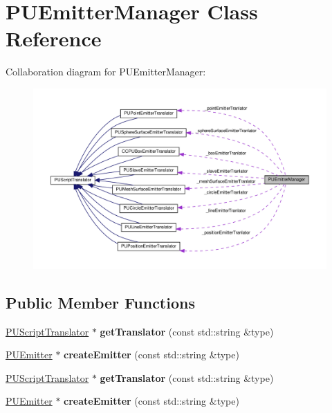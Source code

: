 \hypertarget{classPUEmitterManager}{}\section{P\+U\+Emitter\+Manager Class Reference}
\label{classPUEmitterManager}


Collaboration diagram for P\+U\+Emitter\+Manager\+:
\nopagebreak
\begin{figure}[H]
\begin{center}
\leavevmode
\includegraphics[width=350pt]{classPUEmitterManager__coll__graph}
\end{center}
\end{figure}
\subsection*{Public Member Functions}
\begin{DoxyCompactItemize}
\item 
\mbox{\label{classPUEmitterManager_a0a5ab5c82f03db3e74cf98bbd399eb68}} 
\hyperlink{classPUScriptTranslator}{P\+U\+Script\+Translator} $\ast$ {\bfseries get\+Translator} (const std\+::string \&type)
\item 
\mbox{\label{classPUEmitterManager_a3f111f80562090c8a7d42fa10d66f822}} 
\hyperlink{classPUEmitter}{P\+U\+Emitter} $\ast$ {\bfseries create\+Emitter} (const std\+::string \&type)
\item 
\mbox{\label{classPUEmitterManager_a9d477fdf68d37748e3b769677d5f1f23}} 
\hyperlink{classPUScriptTranslator}{P\+U\+Script\+Translator} $\ast$ {\bfseries get\+Translator} (const std\+::string \&type)
\item 
\mbox{\label{classPUEmitterManager_a87ec9a4b719f1c14245137c4afe510b0}} 
\hyperlink{classPUEmitter}{P\+U\+Emitter} $\ast$ {\bfseries create\+Emitter} (const std\+::string \&type)
\end{DoxyCompactItemize}
